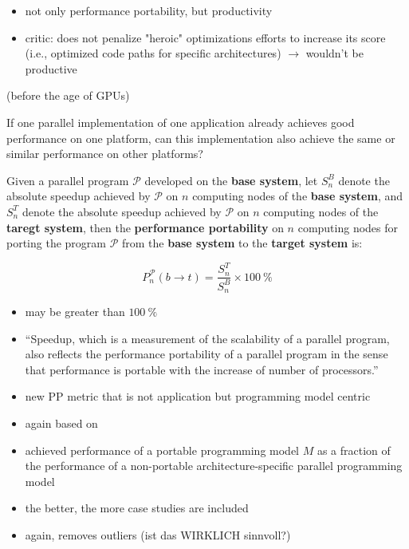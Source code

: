\newpage
\cite{harrell_effective_2018}

\begin{itemize}
    \item not only performance portability, but productivity 
    \item critic: \pp does not penalize "heroic" optimizations efforts to increase its score (i.e., optimized code paths for specific architectures) $\rightarrow$ wouldn't be productive
\end{itemize}



\newpage
\cite{zhu_performance_2007} (before the age of GPUs)

\begin{quotebox}{\citet{zhu_performance_2007}}
    If one parallel implementation of one application already achieves good performance on one platform, can this implementation also achieve the same or similar performance on other platforms?
\end{quotebox}

\begin{definition}
Given a parallel program $\mathcal{P}$ developed on the \textbf{base system}, let $S^B_n$ denote the absolute speedup achieved by $\mathcal{P}$ on $n$ computing nodes of the \textbf{base system}, and $S^T_n$ denote the absolute speedup achieved by $\mathcal{P}$ on $n$ computing nodes of the \textbf{taregt system}, then the \textbf{performance portability} on $n$ computing nodes for porting the program $\mathcal{P}$ from the \textbf{base system} to the \textbf{target system} is:

$$P^\mathcal{P}_n(b \rightarrow t) = \frac{S^T_n}{S^B_n} \times \SI{100}{\percent}$$
\end{definition}

\begin{itemize}
    \item may be greater than $\SI{100}{\percent}$
    \item \enquote{Speedup, which is a measurement of the scalability of a parallel program, also reflects the performance portability of a parallel program in the sense that performance is portable with the increase of number of processors.}
\end{itemize}



\newpage
\cite{marowka_performance_2022}

\begin{itemize}
    \item new PP metric that is not application but programming model centric
    \item again based on \mpp
    \item achieved performance of a portable programming model $M$ as a fraction of the performance of a non-portable architecture-specific parallel programming model
    \item the better, the more case studies are included
    \item again, removes outliers (ist das WIRKLICH sinnvoll?)
    
\end{itemize}

